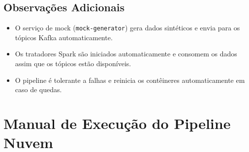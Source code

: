 \documentclass[a4paper,12pt]{article}
\begin{document}
\subsection*{Observações Adicionais}

\begin{itemize}
    \item O serviço de mock (\texttt{mock-generator}) gera dados sintéticos e envia para os tópicos Kafka automaticamente.
    \item Os tratadores Spark são iniciados automaticamente e consomem os dados assim que os tópicos estão disponíveis.
    \item O pipeline é tolerante a falhas e reinicia os contêineres automaticamente em caso de quedas.
\end{itemize}



\section{Manual de Execução do Pipeline Nuvem}
\end{document}
